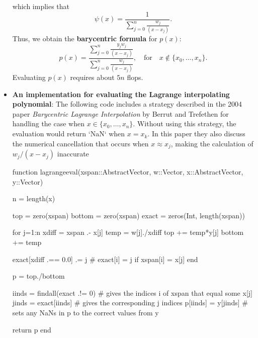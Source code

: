 \documentclass{report}
\begin{document}
\begin{itemize}
    which implies that
    $$\psi(x) = \frac{1}{\sum_{j=0}^n  \frac{w_j}{(x-x_j)}}.$$
    Thus, we obtain the \textbf{barycentric formula} for $p(x)$:
    $$p(x) = \frac{\sum_{j=0}^n  \frac{y_j w_j}{(x-x_j)}}{\sum_{j=0}^n  \frac{w_j}{(x-x_j)}}, 
    \quad \text{for} \quad x \not\in \{x_0, \ldots, x_n\}.$$
    Evaluating $p(x)$ requires about $5n$ flops.
\item \textbf{An implementation for evaluating the Lagrange interpolating polynomial}:
    The following code includes a strategy described in the 2004 paper \textit{Barycentric Lagrange Interpolation}
    by Berrut and Trefethen for handling the case when $x \in \{x_0, \ldots, x_n\}$. Without using this strategy, the evaluation would return `NaN` when $x = x_k$.
    \bigbreak \noindent 
    In this paper they also discuss the numerical cancellation that occurs when $x \approx x_j$, making the calculation of $w_j/(x-x_j)$ inaccurate
    \bigbreak \noindent 
    \begin{jlcode}
function lagrangeeval(xspan::AbstractVector, w::Vector, x::AbstractVector, y::Vector)
    
    n = length(x)
    
    top = zero(xspan)
    bottom = zero(xspan)
    exact = zeros(Int, length(xspan))

    for j=1:n
        xdiff = xspan .- x[j]
        temp = w[j]./xdiff
        top += temp*y[j]
        bottom += temp
        
        exact[xdiff .== 0.0] .= j  # exact[i] = j if xspan[i] = x[j]
    end
    
    p = top./bottom

    iinds = findall(exact .!= 0)  # gives the indices i of xspan that equal some x[j]
    jinds = exact[iinds]          # gives the corresponding j indices
    p[iinds] = y[jinds]           # sets any NaNs in p to the correct values from y
    
    return p  
end


\end{jlcode}
\end{itemize}
\end{document}
